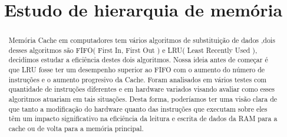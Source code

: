 \documentclass[conference]{IEEEtran}
\begin{document}
\title{Estudo de hierarquia de memória}

\author{
\and
{}
\and
{}
\and
{}
}

\maketitle

\begin{abstract}
   Memória Cache em computadores tem vários algoritmos de 
  substituição de dados ,dois desses algoritmos são FIFO( First In, First Out )
  e LRU( Least Recently Used ), decidimos estudar a eficiência destes dois algoritmos.
  Nossa ideia antes de começar é que LRU fosse ter um desempenho superior ao FIFO com o 
  aumento do número de instruções e o aumento progresivo da Cache. Foram analisados
  em vários testes com quantidade de instruções  diferentes e em hardware
  variados visando avaliar como esses algoritmos atuariam em tais situações.
  Desta forma, poderíamos ter uma visão clara de que tanto  a modificação
  do hardware quanto das instruções que executam sobre eles têm um impacto significativo
  na eficiência da leitura e escrita de dados da RAM para a cache ou de volta para a memória
  principal.
\end{abstract}
\end{document}
